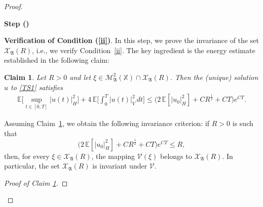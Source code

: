 \documentclass[english,a4paper,11pt]{amsart}
\theoremstyle{plain}
\newtheorem{claim}[theorem]{Claim}
\theoremstyle{definition}
\theoremstyle{remark}
\numberwithin{equation}{section}
\newcounter{lil1}
\newenvironment{step}
{\begin{list} { \bf Step (\Roman{lil1})}
		{ \usecounter{lil1}
			\setlength{\leftmargin}{0.0cm}
			\setlength{\topsep}{0.2cm}
			\setlength{\itemsep}{0.0cm}
			\setlength{\parsep}{0.1cm}
			\setlength{\itemindent}{0.8cm}
			\setlength{\parskip}{0.0cm}}}
	{\end{list}}
\newcounter{lil33}
\newcounter{lil1q}
\newcommand{\MA}{\mathfrak{A}}
\newcommand{\EE}{ \mathbb{E} }
\newcommand{\Mcal} {{\mathcal M}}
\newcommand{\Vcal} {{\mathcal V}}
\newcommand{\Afrak} {{\mathfrak A}}
\newcommand{\X}{\mathbb{X}}
\begin{document}
\begin{proof}
\begin{step}
\item  \textbf{Verification of Condition (\ref{ii})}.
In this step, we prove the invariance of the set \(\mathcal{X}_\MA(R)\), i.e., we verify Condition~\eqref{ii}. 
The key ingredient is the energy estimate established in the following claim:

\begin{claim}\label{eeestimate}
	Let \(R>0\) and let \(\xi\in \Mcal_{\Afrak}^2(\X)\cap \mathcal{X}_\MA(R)\). 
	Then the (unique) solution \(u\) to \eqref{TS1} satisfies
	\begin{align}\label{TS2}
		\EE\Big[\sup_{t\in[0,T]} | u(t) | _H^2\Big]
		+4\,\EE\Big[\int_0^T  | u(t) | _V^2\,dt\Big]
		\le
		\Big(2\,\EE[ | u_0 | _H^2]+C R^{\frac{1}{2}}+CT\Big)e^{CT}.
	\end{align}
\end{claim}
%
Assuming Claim~\ref{eeestimate}, we obtain the following invariance criterion:
if \(R>0\) is such that
\[
\Big(2\,\EE[|u_0|_H^2]+C R^{\frac{1}{2}}+CT\Big)e^{CT}\le R,
\]
then, for every \(\xi\in \mathcal{X}_\MA(R)\), the mapping \(\Vcal(\xi)\) belongs to \(\mathcal{X}_\MA(R)\). In particular, the set $\mathcal{X}_\MA(R)$ is invariant under $\Vcal$.




\begin{proof}[Proof of Claim \ref{eeestimate}]


\end{proof}
\end{step}
\end{proof}
\end{document}
